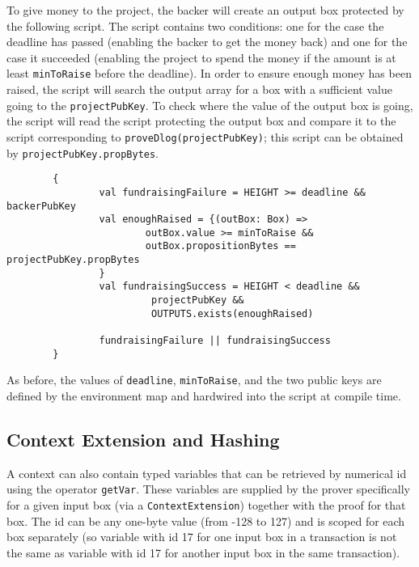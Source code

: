 \documentclass[11pt]{article}
\begin{document}
To give money to the project, the backer will create an output box protected by the following script. The script contains two conditions: one for the case the deadline has passed (enabling the backer to get the money back) and one for the case it succeeded (enabling the project to spend the money if the amount is at least \texttt{minToRaise} before the deadline).  In order to ensure enough money has been raised, the script will search the output array for a box with a sufficient value going to the \texttt{projectPubKey}. To check where the value of the output box is going, the script will read the script protecting the output box and compare it to the script corresponding to \texttt{proveDlog(projectPubKey)}; this script can be obtained by \texttt{projectPubKey.propBytes}.

\begin{verbatim}
        {
                val fundraisingFailure = HEIGHT >= deadline && backerPubKey
                val enoughRaised = {(outBox: Box) =>
                        outBox.value >= minToRaise && 
                        outBox.propositionBytes == projectPubKey.propBytes
                }
                val fundraisingSuccess = HEIGHT < deadline &&
                         projectPubKey &&  
                         OUTPUTS.exists(enoughRaised)
                 
                fundraisingFailure || fundraisingSuccess
        }
\end{verbatim}

As before, the values of \texttt{deadline}, \texttt{minToRaise}, and the two public keys are defined by the environment map and hardwired into the script at compile time. 


\subsection{Context Extension and Hashing}
\label{sec:extension}
A context can also contain typed variables that can be retrieved by numerical id using the operator \texttt{getVar}. These variables are supplied by the prover specifically for a given input box (via a \texttt{ContextExtension}) together with the proof for that box. The id can be any one-byte value (from -128 to 127) and is scoped for each box separately (so variable with id 17 for one input box in a transaction is not the same as variable with id 17 for another input box in the same transaction).
\end{document}
